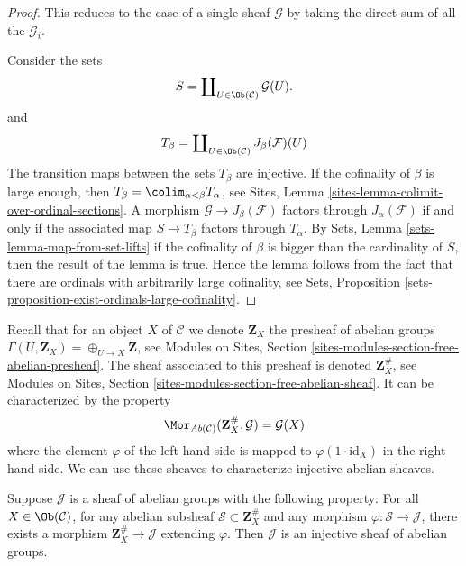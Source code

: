 \begin{proof}
This reduces to the case of a single sheaf $\mathcal{G}$
by taking the direct sum of all the $\mathcal{G}_i$.

\medskip\noindent
Consider the sets
$$
S = \coprod\nolimits_{U \in \Ob(\mathcal{C})} \mathcal{G}(U).
$$
and
$$
T_\beta
=
\coprod\nolimits_{U \in \Ob(\mathcal{C})} J_\beta(\mathcal{F})(U)
$$
The transition maps between the sets $T_\beta$ are injective.
If the cofinality of $\beta$ is large enough, then
$T_\beta = \colim_{\alpha < \beta} T_\alpha$, see
Sites, Lemma \ref{sites-lemma-colimit-over-ordinal-sections}.
A morphism $\mathcal{G} \to J_\beta(\mathcal{F})$ factors
through $J_\alpha(\mathcal{F})$ if and only if
the associated map $S \to T_\beta$ factors through $T_\alpha$.
By
Sets, Lemma \ref{sets-lemma-map-from-set-lifts}
if the cofinality of $\beta$ is bigger than the cardinality
of $S$, then the result of the lemma is true. Hence the lemma
follows from the fact that there are ordinals with arbitrarily
large cofinality, see
Sets, Proposition \ref{sets-proposition-exist-ordinals-large-cofinality}.
\end{proof}

\noindent
Recall that for an object $X$ of $\mathcal{C}$ we denote $\mathbf{Z}_X$
the presheaf of abelian groups $\Gamma(U, \mathbf{Z}_X) =
\oplus_{U \to X} \mathbf{Z}$, see
Modules on Sites, Section \ref{sites-modules-section-free-abelian-presheaf}.
The sheaf associated to this presheaf
is denoted $\mathbf{Z}_X^\#$, see
Modules on Sites, Section \ref{sites-modules-section-free-abelian-sheaf}.
It can be characterized by
the property
\begin{equation}
\label{equation-free-sheaf-on}
\Mor_{\textit{Ab}(\mathcal{C})}(\mathbf{Z}_X^\#, \mathcal{G})
=
\mathcal{G}(X)
\end{equation}
where the element $\varphi$ of the left hand side is mapped
to $\varphi(1 \cdot \text{id}_X)$ in the right hand side. We can use these
sheaves to characterize injective abelian sheaves.

\begin{lemma}
\label{lemma-characterize-injectives}
Suppose $\mathcal{J}$ is a sheaf of abelian groups with the following
property: For all $X\in \Ob(\mathcal{C})$, for any abelian subsheaf
$\mathcal{S} \subset \mathbf{Z}_X^\#$ and any morphism
$\varphi : \mathcal{S} \to \mathcal{J}$, there exists a morphism
$\mathbf{Z}_X^\# \to \mathcal{J}$ extending $\varphi$.
Then $\mathcal{J}$ is an injective sheaf of abelian groups.
\end{lemma}

